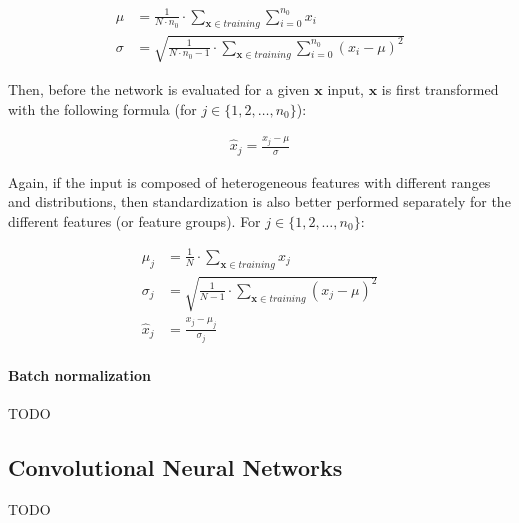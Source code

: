 \documentclass[titlepage]{article}
\begin{document}
          \begin{align*}
            \mu
              & = \frac{1}{N \cdot n_0}
                  \cdot \sum_{\mathbf{x} \in training} \sum_{i=0}^{n_0} x_i \\
            \sigma
              & = \sqrt{
                    \frac{1}{N \cdot n_0 - 1}
                    \cdot \sum_{\mathbf{x} \in training}
                      \sum_{i=0}^{n_0} \left( x_i - \mu \right)^2
                  }
          \end{align*}

          Then, before the network is evaluated for a given $\mathbf{x}$ input,
          $\mathbf{x}$ is first transformed with the following formula
          (for $j \in \{1, 2, \dots, n_0\}$):

          \begin{align*}
            \hat{x}_j = \frac{x_j - \mu}{\sigma}
          \end{align*}

          Again, if the input is composed of heterogeneous features with
          different ranges and distributions, then standardization is also
          better performed separately for the different features (or feature
          groups). For $j \in \{1, 2, \dots, n_0\}$:

          \begin{align*}
            \mu_j
              & = \frac{1}{N}
                  \cdot \sum_{\mathbf{x} \in training} x_j \\
            \sigma_j
              & = \sqrt{
                    \frac{1}{N - 1}
                    \cdot \sum_{\mathbf{x} \in training}
                      \left( x_j - \mu \right)^2
                  } \\
            \hat{x}_j & = \frac{x_j - \mu_j}{\sigma_j}
          \end{align*}

        \paragraph{Batch normalization}

          TODO

\newpage

    \subsection{Convolutional Neural Networks}

      TODO
\end{document}
